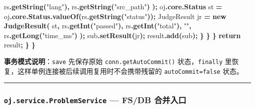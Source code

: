 \documentclass[
  11pt,
]{ctexart}
\newenvironment{Shaded}{\begin{snugshade}}{\end{snugshade}}
\newcommand{\ControlFlowTok}[1]{\textcolor[rgb]{0.13,0.29,0.53}{\textbf{#1}}}
\newcommand{\FunctionTok}[1]{\textcolor[rgb]{0.13,0.29,0.53}{\textbf{#1}}}
\newcommand{\KeywordTok}[1]{\textcolor[rgb]{0.13,0.29,0.53}{\textbf{#1}}}
\newcommand{\NormalTok}[1]{#1}
\newcommand{\OperatorTok}[1]{\textcolor[rgb]{0.81,0.36,0.00}{\textbf{#1}}}
\newcommand{\StringTok}[1]{\textcolor[rgb]{0.31,0.60,0.02}{#1}}
\begin{document}
\begin{Shaded}
\begin{Highlighting}[]
\NormalTok{                        rs}\OperatorTok{.}\FunctionTok{getString}\OperatorTok{(}\StringTok{"lang"}\OperatorTok{),}
\NormalTok{                        rs}\OperatorTok{.}\FunctionTok{getString}\OperatorTok{(}\StringTok{"src\_path"}\OperatorTok{)}
                    \OperatorTok{);}
\NormalTok{                    oj}\OperatorTok{.}\FunctionTok{core}\OperatorTok{.}\FunctionTok{Status}\NormalTok{ st }\OperatorTok{=}\NormalTok{ oj}\OperatorTok{.}\FunctionTok{core}\OperatorTok{.}\FunctionTok{Status}\OperatorTok{.}\FunctionTok{valueOf}\OperatorTok{(}\NormalTok{rs}\OperatorTok{.}\FunctionTok{getString}\OperatorTok{(}\StringTok{"status"}\OperatorTok{));}
\NormalTok{                    JudgeResult jr }\OperatorTok{=} \KeywordTok{new} \FunctionTok{JudgeResult}\OperatorTok{(}
\NormalTok{                        st}\OperatorTok{,}
\NormalTok{                        rs}\OperatorTok{.}\FunctionTok{getInt}\OperatorTok{(}\StringTok{"passed"}\OperatorTok{),}
\NormalTok{                        rs}\OperatorTok{.}\FunctionTok{getInt}\OperatorTok{(}\StringTok{"total"}\OperatorTok{),}
                        \StringTok{""}\OperatorTok{,}
\NormalTok{                        rs}\OperatorTok{.}\FunctionTok{getLong}\OperatorTok{(}\StringTok{"time\_ms"}\OperatorTok{)}
                    \OperatorTok{);}
\NormalTok{                    sub}\OperatorTok{.}\FunctionTok{setResult}\OperatorTok{(}\NormalTok{jr}\OperatorTok{);}
\NormalTok{                    result}\OperatorTok{.}\FunctionTok{add}\OperatorTok{(}\NormalTok{sub}\OperatorTok{);}
                \OperatorTok{\}}
            \OperatorTok{\}}
        \OperatorTok{\}}
        \ControlFlowTok{return}\NormalTok{ result}\OperatorTok{;}
    \OperatorTok{\}}
\OperatorTok{\}}
\end{Highlighting}
\end{Shaded}

\textbf{事务模式说明}：\texttt{save} 先保存原始
\texttt{conn.getAutoCommit()} 状态，\texttt{finally}
里恢复，这样单例连接被后续调用复用时不会携带残留的
\texttt{autoCommit=false} 状态。

\begin{center}\rule{0.5\linewidth}{0.5pt}\end{center}

\hypertarget{oj.service.problemservice-fsdb-ux5408ux5e76ux5165ux53e3}{%
\subsubsection{\texorpdfstring{\texttt{oj.service.ProblemService} ---
FS/DB
合并入口}{oj.service.ProblemService --- FS/DB 合并入口}}\label{oj.service.problemservice-fsdb-ux5408ux5e76ux5165ux53e3}}
\end{document}
